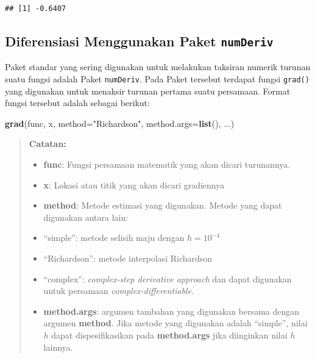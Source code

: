 \documentclass[]{book}
\newenvironment{Shaded}{\begin{snugshade}}{\end{snugshade}}
\newcommand{\DataTypeTok}[1]{\textcolor[rgb]{0.13,0.29,0.53}{#1}}
\newcommand{\KeywordTok}[1]{\textcolor[rgb]{0.13,0.29,0.53}{\textbf{#1}}}
\newcommand{\NormalTok}[1]{#1}
\newcommand{\StringTok}[1]{\textcolor[rgb]{0.31,0.60,0.02}{#1}}
\providecommand{\tightlist}{%
  \setlength{\itemsep}{0pt}\setlength{\parskip}{0pt}}
\theoremstyle{definition}
\theoremstyle{definition}
\theoremstyle{definition}
\theoremstyle{remark}
\begin{document}
\begin{verbatim}
## [1] -0.6407
\end{verbatim}

\hypertarget{diferensiasi-menggunakan-paket-numderiv}{%
\subsection{\texorpdfstring{Diferensiasi Menggunakan Paket \texttt{numDeriv}}{Diferensiasi Menggunakan Paket numDeriv}}\label{diferensiasi-menggunakan-paket-numderiv}}

Paket standar yang sering digunakan untuk melakukan taksiran numerik turunan suatu fungsi adalah Paket \texttt{numDeriv}. Pada Paket tersebut terdapat fungsi \texttt{grad()} yang digunakan untuk menaksir turunan pertama suatu persamaan. Format fungsi tersebut adalah sebagai berikut:

\begin{Shaded}
\begin{Highlighting}[]
\KeywordTok{grad}\NormalTok{(func, x, }\DataTypeTok{method=}\StringTok{"Richardson"}\NormalTok{, }\DataTypeTok{method.args=}\KeywordTok{list}\NormalTok{(), ...)}
\end{Highlighting}
\end{Shaded}

\begin{quote}
\textbf{Catatan:}

\begin{itemize}
\tightlist
\item
  \textbf{func}: Fungsi persamaan matematik yang akan dicari turunannya.
\item
  \textbf{x}: Lokasi atau titik yang akan dicari gradiennya
\item
  \textbf{method}: Metode estimasi yang digunakan. Metode yang dapat digunakan antara lain:
\item
  ``simple'': metode selisih maju dengan \(h = 10^{-4}\)
\item
  ``Richardson'': metode interpolasi Richardson
\item
  ``complex'': \emph{complex-step derivative approach} dan dapat digunakan untuk persamaan \emph{complex-differentiable}.
\item
  \textbf{method.args}: argumen tambahan yang digunakan bersama dengan argumen \textbf{method}. Jika metode yang digunakan adalah ``simple'', nilai \(h\) dapat dispesifikasikan pada \textbf{method.args} jika diinginkan nilai \(h\) lainnya.
\end{itemize}
\end{quote}
\end{document}
